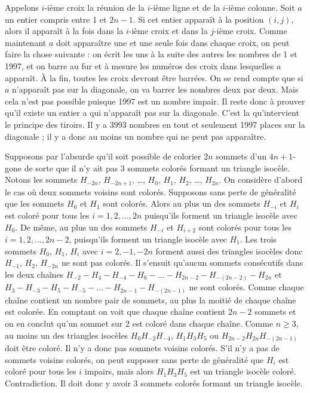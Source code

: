 \begin{sol}
Appelons $i$-ième croix la réunion de la $i$-ième ligne et de la $i$-ième colonne. Soit $a$ un entier compris entre 1 et $2n-1$. Si cet entier apparaît à la position $(i, j)$, alors il apparaît à la fois dans la $i$-ième croix et dans la $j$-ième croix. Comme
maintenant $a$ doit apparaître une et une seule fois dans chaque croix, on peut faire la chose suivante : on écrit les uns à la suite des autres les nombres de 1 et 1997, et on barre au fur et à mesure les numéros des croix dans lesquelles $a$ apparaît. À la fin, toutes les croix devront être barrées.
\newline
On se rend compte que si $a$ n'apparaît pas sur la diagonale, on va barrer les nombres deux par deux. Mais cela n'est pas possible puisque 1997 est un nombre impair. 
\newline
Il reste donc à prouver qu'il existe un entier a qui n'apparaît pas sur la diagonale. C'est la qu'intervient le principe des tiroirs. Il y a 3993 nombres en tout et seulement 1997 places sur la diagonale ; il y a donc au moins un nombre qui ne peut pas apparaître.
\end{sol}

\begin{sol}
Supposons par l'absurde qu'il soit possible de colorier $2n$ sommets d'un $4n+ 1$-gone de sorte que
il n'y ait pas 3 sommets colorés formant un triangle isocèle. Notons les sommets $H_{-2n}$, $H_{-2n+1}$, \dots , $H_0$, $H_1$, $H_2$, \dots, $H_{2n}$. 
\newline
On considère d'abord le cas où deux sommets voisins sont colorés. Supposons sans perte de généralité que les sommets $H_0$ et $H_1$ sont colorés. Alors au plus un des sommets $H_{-i}$ et $H_i$ est coloré pour tous les $i = 1, 2, . . . , 2n$ puisqu'ils forment un triangle isocèle avec $H_0$. 
\newline
De même, au plus un des sommets $H_{-i}$ et $H_{i+2}$ sont colorés pour tous les $i = 1, 2, . . . , 2n-2$, puisqu'ils forment un triangle isocèle avec $H_{1}$. 
\newline
Les trois sommets $H_0$, $H_1$, $H_i$ avec $i = 2, -1, -2n$
forment aussi des triangles isocèles donc $H_{-1}$, $H_2$, $H_{-2n}$ ne sont pas colorés. Il s'ensuit qu'aucun sommets consécutifs dans les deux chaînes
$H_{-2} - H_4 - H_{-4} - H_6 - . . . - H_{2n-2} - H_{-(2n-2)} - H_{2n}$ et $H_3 - H_{-3} - H_5 - H_{-5} - . . . - H_{2n-1} - H_{-(2n-1)}$ ne sont colorés.
\newline
Comme chaque chaîne contient un nombre pair de sommets, au plus la moitié de chaque chaîne est colorée. En comptant on voit que chaque chaîne contient $2n - 2$ sommets et on en conclut qu'un sommet sur 2 est coloré dans chaque chaîne. Comme $n \ge 3$, au moins un des triangles isocèles $H_0H_{-2}H_{-4}$, $H_1H_3H_5$ ou $H_{2n-2}H_{2n}H_{-(2n-1)}$ doit être coloré. Il n'y a donc pas sommets voisins colorés.
\newline
S'il n'y a pas de sommets voisins colorés, on peut supposer sans perte de généralité que $H_i$ est coloré pour tous les $i$ impairs, mais alors $H_1H_3H_5$ est un triangle isocèle coloré. Contradiction. Il doit donc y avoir 3 sommets colorés formant un triangle isocèle.
\end{sol}


